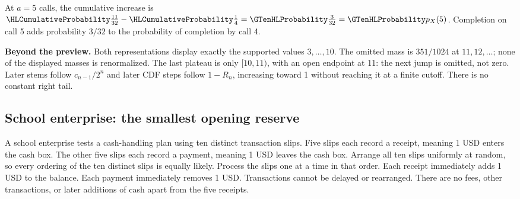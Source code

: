 \begin{center}
\begin{minipage}{\linewidth}
\end{minipage}\end{center}
\cTwoConnectionReading
\par\smallskip At $a=5$ calls, the cumulative increase is $\cTwoCDFHL{\frac{11}{32}}-\cTwoCDFHL{\frac14}=\cTwoMassHL{\frac3{32}}=\cTwoMassHL{p_X(5)}$. Completion on call 5 adds probability $3/32$ to the probability of completion by call 4.
\par\textbf{Beyond the preview.} Both representations display exactly the supported values $3,\ldots,10$. The omitted mass is $351/1024$ at $11,12,\ldots$; none of the displayed masses is renormalized. The last plateau is only $[10,11)$, with an open endpoint at 11: the next jump is omitted, not zero. Later stems follow $c_{n-1}/2^n$ and later CDF steps follow $1-R_n$, increasing toward 1 without reaching it at a finite cutoff. There is no constant right tail.
\ifGTenHighlights\else\par\vspace{3mm}\fi
{}

\clearpage
\subsection{School enterprise: the smallest opening reserve}\label{prob:reserve}
A school enterprise tests a cash-handling plan using ten distinct transaction slips. Five slips each record a receipt, meaning 1 USD enters the cash box. The other five slips each record a payment, meaning 1 USD leaves the cash box. Arrange all ten slips uniformly at random, so every ordering of the ten distinct slips is equally likely. Process the slips one at a time in that order. Each receipt immediately adds 1 USD to the balance. Each payment immediately removes 1 USD. Transactions cannot be delayed or rearranged. There are no fees, other transactions, or later additions of cash apart from the five receipts.

